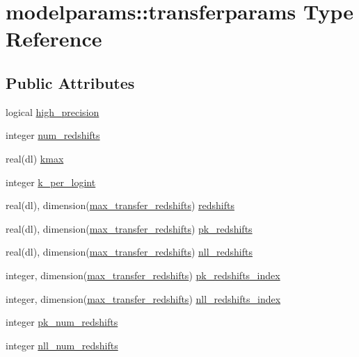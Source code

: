 \hypertarget{structmodelparams_1_1transferparams}{}\section{modelparams\+:\+:transferparams Type Reference}
\label{structmodelparams_1_1transferparams}
\subsection*{Public Attributes}
\begin{DoxyCompactItemize}
\item 
logical \mbox{\hyperlink{structmodelparams_1_1transferparams_a12aeee0265939c428ddc9eedd413576b}{high\+\_\+precision}}
\item 
integer \mbox{\hyperlink{structmodelparams_1_1transferparams_a30262ff0416db94c99af29fb0a9f1845}{num\+\_\+redshifts}}
\item 
real(dl) \mbox{\hyperlink{structmodelparams_1_1transferparams_ac7bae1729ecfdbde84f369d070f7f8ee}{kmax}}
\item 
integer \mbox{\hyperlink{structmodelparams_1_1transferparams_a68f7619c09358111b48d10cd44fa38aa}{k\+\_\+per\+\_\+logint}}
\item 
real(dl), dimension(\mbox{\hyperlink{namespacemodelparams_abe7b8d46cfb994afa85d77bbb5b6b5d5}{max\+\_\+transfer\+\_\+redshifts}}) \mbox{\hyperlink{structmodelparams_1_1transferparams_a7ae8460fbd85298c3eb072cdc735d83f}{redshifts}}
\item 
real(dl), dimension(\mbox{\hyperlink{namespacemodelparams_abe7b8d46cfb994afa85d77bbb5b6b5d5}{max\+\_\+transfer\+\_\+redshifts}}) \mbox{\hyperlink{structmodelparams_1_1transferparams_ae8873557afe947e0bcafc77a6be53b73}{pk\+\_\+redshifts}}
\item 
real(dl), dimension(\mbox{\hyperlink{namespacemodelparams_abe7b8d46cfb994afa85d77bbb5b6b5d5}{max\+\_\+transfer\+\_\+redshifts}}) \mbox{\hyperlink{structmodelparams_1_1transferparams_afc4fc138f1feb5a2d05eab66ddf0b7bd}{nll\+\_\+redshifts}}
\item 
integer, dimension(\mbox{\hyperlink{namespacemodelparams_abe7b8d46cfb994afa85d77bbb5b6b5d5}{max\+\_\+transfer\+\_\+redshifts}}) \mbox{\hyperlink{structmodelparams_1_1transferparams_abe338a7dd905df6579837a4b8d6dcdf9}{pk\+\_\+redshifts\+\_\+index}}
\item 
integer, dimension(\mbox{\hyperlink{namespacemodelparams_abe7b8d46cfb994afa85d77bbb5b6b5d5}{max\+\_\+transfer\+\_\+redshifts}}) \mbox{\hyperlink{structmodelparams_1_1transferparams_a8a07a5026c35194244e05fcb0f3ecd65}{nll\+\_\+redshifts\+\_\+index}}
\item 
integer \mbox{\hyperlink{structmodelparams_1_1transferparams_a0cd6b66f4448ee7ad5d4cc72cc510c92}{pk\+\_\+num\+\_\+redshifts}}
\item 
integer \mbox{\hyperlink{structmodelparams_1_1transferparams_a5283fd24ba4815f555cf4d70ce964df1}{nll\+\_\+num\+\_\+redshifts}}
\end{DoxyCompactItemize}


